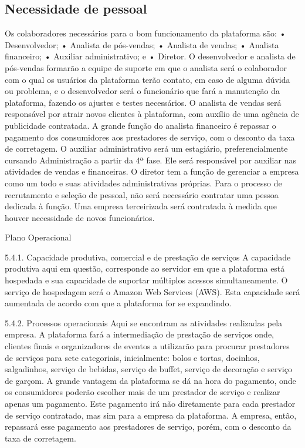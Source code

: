 \subsection{Necessidade de pessoal}
Os colaboradores necessários para o bom funcionamento da plataforma são: 
• Desenvolvedor; 
• Analista de pós-vendas; 
• Analista de vendas; 
• Analista financeiro; 
• Auxiliar administrativo; e 
• Diretor. 
O desenvolvedor e analista de pós-vendas formarão a equipe de suporte em 
que o analista será o colaborador com o qual os usuários da plataforma terão contato, 
em caso de alguma dúvida ou problema, e o desenvolvedor será o funcionário que 
fará a manutenção da plataforma, fazendo os ajustes e testes necessários. 
O analista de vendas será responsável por atrair novos clientes à plataforma, 
com auxílio de uma agência de publicidade contratada. 
A grande função do analista financeiro é repassar o pagamento dos
consumidores aos prestadores de serviço, com o desconto da taxa de corretagem. 
O auxiliar administrativo será um estagiário, preferencialmente cursando 
Administração a partir da 4ª fase. Ele será responsável por auxiliar nas atividades de 
vendas e financeiras. 
O diretor tem a função de gerenciar a empresa como um todo e suas atividades 
administrativas próprias. 
Para o processo de recrutamento e seleção de pessoal, não será necessário 
contratar uma pessoa dedicada à função. Uma empresa terceirizada será contratada 
à medida que houver necessidade de novos funcionários.






Plano Operacional 

5.4.1. Capacidade produtiva, comercial e de prestação de serviços 
A capacidade produtiva aqui em questão, corresponde ao servidor em que a plataforma está hospedada e sua capacidade de suportar múltiplos acessos simultaneamente. O serviço de hospedagem será o Amazon Web Services (AWS). Esta capacidade será aumentada de acordo com que a plataforma for se expandindo.  

5.4.2. Processos operacionais 
Aqui se encontram as atividades realizadas pela empresa. A plataforma fará a intermediação de prestação de serviços onde, clientes finais e organizadores de eventos a utilizarão para procurar prestadores de serviços para sete categoriais, inicialmente: bolos e tortas, docinhos, salgadinhos, serviço de bebidas, serviço de buffet, serviço de decoração e serviço de garçom. 
A grande vantagem da plataforma se dá na hora do pagamento, onde os consumidores poderão escolher mais de um prestador de serviço e realizar apenas um pagamento. Este pagamento irá não diretamente para cada prestador de serviço contratado, mas sim para a empresa da plataforma. A empresa, então, repassará esse pagamento aos prestadores de serviço, porém, com o desconto da taxa de corretagem. 

